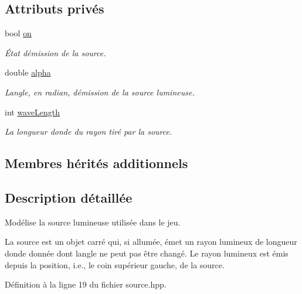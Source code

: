 \subsection*{Attributs privés}
\begin{DoxyCompactItemize}
\item 
bool \hyperlink{classSource_a107c6fed00d6f92226c2e6b9952a28d8}{on}
\begin{DoxyCompactList}\small\item\em État d\textquotesingle{}émission de la source. \end{DoxyCompactList}\item 
double \hyperlink{classSource_a6dc971f9c6ba4291e9d70d622b2425bf}{alpha}
\begin{DoxyCompactList}\small\item\em L\textquotesingle{}angle, en radian, d\textquotesingle{}émission de la source lumineuse. \end{DoxyCompactList}\item 
int \hyperlink{classSource_a1909285fbaf2074d3aee9386a32ebb74}{wave\+Length}
\begin{DoxyCompactList}\small\item\em La longueur d\textquotesingle{}onde du rayon tiré par la source. \end{DoxyCompactList}\end{DoxyCompactItemize}
\subsection*{Membres hérités additionnels}


\subsection{Description détaillée}
Modélise la source lumineuse utilisée dans le jeu. 

La source est un objet carré qui, si allumée, émet un rayon lumineux de longueur d\textquotesingle{}onde donnée dont l\textquotesingle{}angle ne peut pas être changé. Le rayon lumineux est émis depuis la position, i.\+e., le coin supérieur gauche, de la source. 

Définition à la ligne 19 du fichier source.\+hpp.



